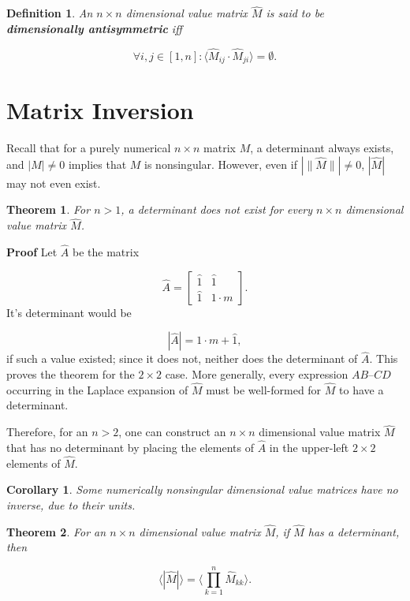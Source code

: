 \documentclass[10pt,letterpaper]{article}
\newtheorem{defn}{Definition}[section]
\newtheorem{thm}{Theorem}[section]
\newtheorem{cor}{Corollary}[section]
\newenvironment{proof}{\noindent\textbf{Proof} }{\qed \newline}
\newcommand{\qed}{\nobreak \ifvmode \relax \else
      \ifdim\lastskip<1.5em \hskip-\lastskip
      \hskip1.5em plus0em minus0.5em \fi \nobreak
      \vrule height0.75em width0.5em depth0.25em\fi}
\numberwithin{equation}{section}
\begin{document}
\begin{defn}An $n \times n$ dimensional value matrix $\hat M$ is said
  to be \textbf{dimensionally antisymmetric} iff

  \[ \forall i,j \in [1, n] : \langle \hat M_{ij} \cdot \hat M_{ji}
  \rangle = \emptyset . \] \end{defn}

\section{Matrix Inversion}

Recall that for a purely numerical $n \times n$ matrix $M$, a
determinant always exists, and $|M| \not= 0$ implies that $M$ is
nonsingular.  However, even if $| \| \hat M \| | \not= 0$, $| \hat M
|$ may not even exist.

\begin{thm}For $n > 1$, a determinant does not exist for every $n
  \times n$ dimensional value matrix $\hat M$. \end{thm}

\begin{proof}Let $\hat A$ be the matrix

\[ \hat A = \left[ \begin{matrix}
 \hat 1 & \hat 1 \\
 \hat 1 & 1 \cdot m
 \end{matrix} \right] . \] It's determinant would be

\[ | \hat A | = 1 \cdot m + \hat 1 , \] if such a value existed; since
it does not, neither does the determinant of $\hat A$.  This proves
the theorem for the $2 \times 2$ case.  More generally, every
expression $AB – CD$ occurring in the Laplace expansion of $\hat M$
must be well-formed for $\hat M$ to have a determinant.

Therefore, for an $n > 2$, one can construct an $n \times n$
dimensional value matrix $\hat M$ that has no determinant by placing
the elements of $\hat A$ in the upper-left $2 \times 2$ elements of
$\hat M$. \end{proof}

\begin{cor}Some numerically nonsingular dimensional value matrices
  have no inverse, due to their units.\end{cor}

\begin{thm}For an $n \times n$ dimensional value matrix $\hat M$, if
  $\hat M$ has a determinant, then

  \[ \langle | \hat M | \rangle = \langle \prod_{k=1}^n \hat M_{kk}
  \rangle . \]\end{thm}
\end{document}
